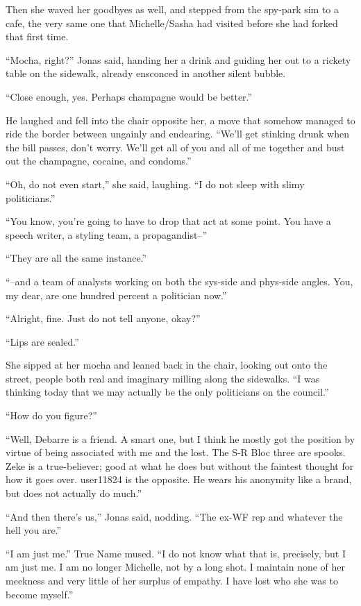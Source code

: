 Then she waved her goodbyes as well, and stepped from the spy-park sim to a cafe, the very same one that Michelle/Sasha had visited before she had forked that first time.

``Mocha, right?'' Jonas said, handing her a drink and guiding her out to a rickety table on the sidewalk, already ensconced in another silent bubble.

``Close enough, yes. Perhaps champagne would be better.''

He laughed and fell into the chair opposite her, a move that somehow managed to ride the border between ungainly and endearing. ``We'll get stinking drunk when the bill passes, don't worry. We'll get all of you and all of me together and bust out the champagne, cocaine, and condoms.''

``Oh, do not even start,'' she said, laughing. ``I do not sleep with slimy politicians.''

``You know, you're going to have to drop that act at some point. You have a speech writer, a styling team, a propagandist--''

``They are all the same instance.''

``--and a team of analysts working on both the sys-side and phys-side angles. You, my dear, are one hundred percent a politician now.''

``Alright, fine. Just do not tell anyone, okay?''

``Lips are sealed.''

She sipped at her mocha and leaned back in the chair, looking out onto the street, people both real and imaginary milling along the sidewalks. ``I was thinking today that we may actually be the only politicians on the council.''

``How do you figure?''

``Well, Debarre is a friend. A smart one, but I think he mostly got the position by virtue of being associated with me and the lost. The S-R Bloc three are spooks. Zeke is a true-believer; good at what he does but without the faintest thought for how it goes over. user11824 is the opposite. He wears his anonymity like a brand, but does not actually do much.''

``And then there's us,'' Jonas said, nodding. ``The ex-WF rep and whatever the hell you are.''

``I am just me.'' True Name mused. ``I do not know what that is, precisely, but I am just me. I am no longer Michelle, not by a long shot. I maintain none of her meekness and very little of her surplus of empathy. I have lost who she was to become myself.''

